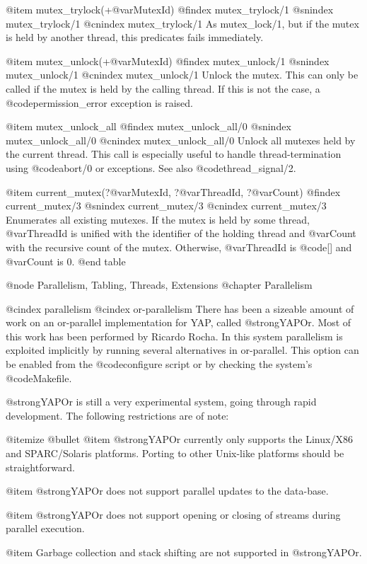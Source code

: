 {{{{{{{{{@item mutex_trylock(+@var{MutexId})
@findex mutex_trylock/1
@snindex mutex_trylock/1
@cnindex mutex_trylock/1
As mutex_lock/1, but if the mutex is held by another thread, this
predicates fails immediately.

@item mutex_unlock(+@var{MutexId})
@findex mutex_unlock/1
@snindex mutex_unlock/1
@cnindex mutex_unlock/1
Unlock the mutex. This can only be called if the mutex is held by the
calling thread. If this is not the case, a @code{permission_error}
exception is raised.

@item mutex_unlock_all
@findex mutex_unlock_all/0
@snindex mutex_unlock_all/0
@cnindex mutex_unlock_all/0
Unlock all mutexes held by the current thread.  This call is especially
useful to handle thread-termination using @code{abort/0} or exceptions.  See
also @code{thread_signal/2}.

@item current_mutex(?@var{MutexId}, ?@var{ThreadId}, ?@var{Count})
@findex current_mutex/3
@snindex current_mutex/3
@cnindex current_mutex/3
Enumerates all existing mutexes.  If the mutex is held by some thread,
@var{ThreadId} is unified with the identifier of the holding thread and
@var{Count} with the recursive count of the mutex. Otherwise,
@var{ThreadId} is @code{[]} and @var{Count} is 0.
@end table


@node Parallelism, Tabling, Threads, Extensions
@chapter Parallelism

@cindex parallelism
@cindex or-parallelism
There has been a sizeable amount of work on an or-parallel
implementation for YAP, called @strong{YAPOr}. Most of this work has
been performed by Ricardo Rocha. In this system parallelism is exploited
implicitly by running several alternatives in or-parallel. This option
can be enabled from the @code{configure} script or by checking the
system's @code{Makefile}.

@strong{YAPOr} is still a very experimental system, going through rapid
development. The following restrictions are of note:

@itemize @bullet
@item @strong{YAPOr} currently only supports the Linux/X86 and SPARC/Solaris
platforms. Porting to other Unix-like platforms should be straightforward.

@item @strong{YAPOr} does not support parallel updates to the
data-base.

@item @strong{YAPOr} does not support opening or closing of streams during
parallel execution.

@item Garbage collection and stack shifting are not supported in
@strong{YAPOr}.  

}}}}}}}}}
